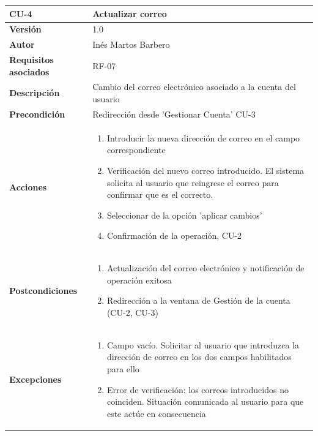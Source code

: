 \begin{table}[p]
	\centering
	\begin{tabularx}{\linewidth}{ p{} p{} }
		\toprule
		\textbf{CU-4}    & \textbf{Actualizar correo}\\
		\toprule
		\textbf{Versión}              & 1.0    \\
		\textbf{Autor}                & Inés Martos Barbero \\
		\textbf{Requisitos asociados} & RF-07 \\
		\textbf{Descripción}          & Cambio del correo electrónico asociado a la cuenta del usuario \\
		\textbf{Precondición}         & Redirección desde 'Gestionar Cuenta' CU-3 \\
		\textbf{Acciones}             &
		\begin{enumerate}
			\def\labelenumi{\arabic{enumi}.}
			\tightlist
			\item Introducir la nueva dirección de correo en el campo correspondiente
			\item Verificación del nuevo correo introducido. El sistema solicita al usuario que reingrese el correo para confirmar que es el correcto.
                \item Seleccionar de la opción 'aplicar cambios'
                \item Confirmación de la operación, CU-2
		\end{enumerate}\\
		\textbf{Postcondiciones}        &
		\begin{enumerate}
			\def\labelenumi{\arabic{enumi}.}
			\tightlist
			\item Actualización del correo electrónico y notificación de operación exitosa
                \item Redirección a la ventana de Gestión de la cuenta (CU-2, CU-3)
		\end{enumerate}\\
		\textbf{Excepciones}          & 
            \begin{enumerate}
			\def\labelenumi{\arabic{enumi}.}
			\tightlist
			\item Campo vacío. Solicitar al usuario que introduzca la dirección de correo en los dos campos habilitados para ello
                \item Error de verificación: los correos introducidos no coinciden. Situación comunicada al usuario para que este actúe en consecuencia

\end{enumerate}
\end{tabularx}
\end{table}
